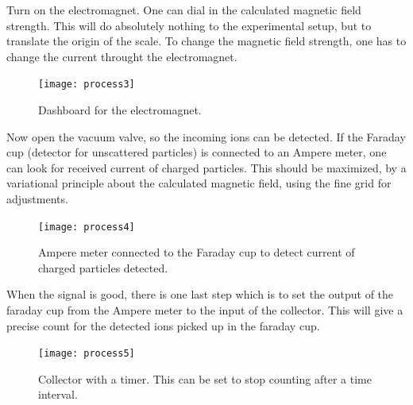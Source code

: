 Turn on the electromagnet. One can dial in the calculated magnetic field
strength. This will do absolutely nothing to the experimental setup, but to
translate the origin of the scale. To change the magnetic field strength, one
has to change the current throught the electromagnet.
\begin{figure}[h!]
\centering
\texttt{[image: process3]}
\caption{Dashboard for the electromagnet.}
\label{fig_process3}
\end{figure}

Now open the vacuum valve, so the incoming ions can be detected.
If the Faraday cup (detector for unscattered particles) is connected to an Ampere
meter, one can look for received current of charged particles. This should be
maximized, by a variational principle about the calculated magnetic field,
using the fine grid for adjustments.

\begin{figure}[h!]
\centering
\texttt{[image: process4]}
\caption{Ampere meter connected to the Faraday cup to detect current of charged
particles detected.}
\label{fig_process4}
\end{figure}
When the signal is good, there is one last step which is to set the output of
the faraday cup from the Ampere meter to the input of the collector. This will
give a precise count for the detected ions picked up in the faraday cup.
\begin{figure}[b]
\centering
\texttt{[image: process5]}
\caption{Collector with a timer. This can be set to stop counting after a time
interval.}
\label{fig_process5}
\end{figure}

